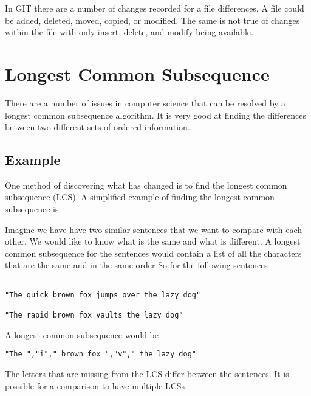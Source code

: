 In GIT there are a number of changes recorded for a file differences,  A file could be added, deleted, moved, copied, or modified.  The same is not true of changes within the file with only insert, delete, and modify being available.

\section{Longest Common Subsequence}
There are a number of issues in computer science that can be resolved by a longest common subsequence algorithm.
It is very good at finding the differences between two different sets of ordered information.


\subsection{Example}
One method of discovering what has changed is to find the longest common subsequence (LCS).
A simplified example of finding the longest common subsequence is:

Imagine we have have two similar sentences that we want to compare with each other.  
We would like to know what is the same and what is different.
A longest common subsequence for the sentences would contain a list of all the characters that are the same and in the same order
So for the following sentences

\begin{verbatim}

"The quick brown fox jumps over the lazy dog"

"The rapid brown fox vaults the lazy dog"

\end{verbatim}
A longest common subsequence would be
\begin{verbatim}
"The ","i"," brown fox ","v"," the lazy dog"
\end{verbatim}
The letters that are missing from the LCS differ between the sentences.
It is possible for a comparison to have multiple LCSs.

